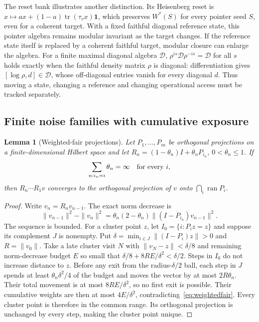 \documentclass[12pt]{article}
\newtheorem{lemma}[theorem]{Lemma}
\theoremstyle{definition}
\theoremstyle{remark}
\begin{document}
The reset bank illustrates another distinction. Its Heisenberg reset
is \(x\mapsto a x+(1-a)\operatorname{tr}(\tau_vx)\mathbf1\),
which preserves \(W^*(S)\) for every pointer seed \(S\), even for a
coherent target. With a fixed faithful diagonal reference state, this
pointer algebra remains modular invariant as the target changes.
If the reference state itself is replaced by a coherent faithful
target, modular closure can enlarge the algebra. For a finite
maximal diagonal algebra \(\mathcal D\),
\(\rho^{is}\mathcal D\rho^{-is}=\mathcal D\) for all \(s\) holds
exactly when the faithful density matrix \(\rho\) is diagonal:
differentiation gives
\([\log\rho,d]\in\mathcal D\), whose off-diagonal entries vanish
for every diagonal \(d\). Thus moving a state, changing a reference
and changing operational access must be tracked separately.

\subsection{Finite noise families with cumulative exposure}

\begin{lemma}[Weighted-fair projections]\label{lem:weightedfair}
Let \(P_1,\ldots,P_m\) be orthogonal projections on a
finite-dimensional Hilbert space and let
\(R_n=(1-\theta_n)I+\theta_n P_{i_n}\), \(0<\theta_n\le1\).
If
\begin{equation}\label{eq:weightedfair}
 \sum_{n:i_n=i}\theta_n=\infty\quad\hbox{for every }i ,
\end{equation}
then \(R_n\cdots R_1v\) converges to the orthogonal projection of
\(v\) onto \(\bigcap_i\operatorname{ran}P_i\).
\end{lemma}
\begin{proof}
Write \(v_n=R_nv_{n-1}\). The exact norm decrease is
\[
 \|v_{n-1}\|^2-\|v_n\|^2
 =\theta_n(2-\theta_n)\|(I-P_{i_n})v_{n-1}\|^2 .
\]
The sequence is bounded. For a cluster point \(z\), let
\(I_0=\{i:P_i z=z\}\) and suppose its complement \(J\) is nonempty.
Put \(\delta=\min_{i\in J}\|(I-P_i)z\|>0\) and \(R=\|v_0\|\).
Take a late cluster visit \(N\) with
\(\|v_N-z\|<\delta/8\) and remaining norm-decrease budget \(E\)
so small that \(\delta/8+8RE/\delta^2<\delta/2\).
Steps in \(I_0\) do not increase distance to \(z\).
Before any exit from the radius-\(\delta/2\) ball, each step in
\(J\) spends at least \(\theta_n\delta^2/4\) of the budget and
moves the vector by at most \(2R\theta_n\). Their total movement
is at most \(8RE/\delta^2\), so no first exit is possible.
Their cumulative weights are then at most \(4E/\delta^2\),
contradicting~\eqref{eq:weightedfair}. Every cluster point is
therefore in the common range. Its orthogonal projection is
unchanged by every step, making the cluster point unique.
\end{proof}
\end{document}
